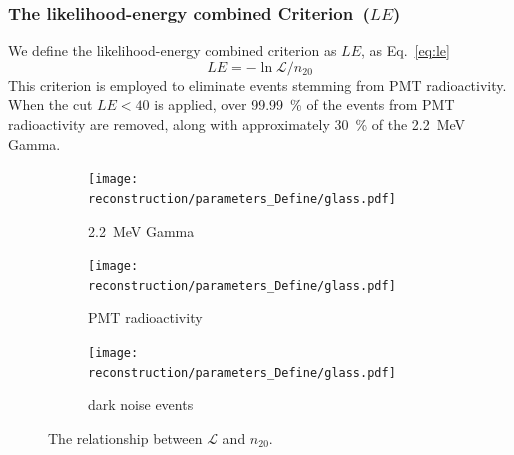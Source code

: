 \subsubsection{The likelihood-energy combined Criterion~($LE$)}
We define the likelihood-energy combined criterion as $LE$, as Eq.~\eqref{eq:le}
\begin{equation}
	LE = -\ln \mathcal{L}/n_{20}
	\label{eq:le}
\end{equation}
This criterion is employed to eliminate events stemming from PMT radioactivity. When the cut $LE < 40$ is applied, over \SI{99.99}{\%} of the events from PMT radioactivity are removed, along with approximately \SI{30}{\%} of the \SI{2.2}{MeV} Gamma.
\begin{figure}[htbp]
	\centering
	\begin{subfigure}{0.32\textwidth} %
		\centering
		\texttt{[image: reconstruction/parameters\_Define/glass.pdf]}
		\caption{\SI{2.2}{MeV} Gamma}
		\label{fig:glass3}
	\end{subfigure}%
	\hfill
	\begin{subfigure}{0.32\textwidth}
		\centering
		\texttt{[image: reconstruction/parameters\_Define/glass.pdf]}
		\caption{PMT radioactivity}
		\label{fig:glass6}
	\end{subfigure}%
	\hfill
	\begin{subfigure}{0.32\textwidth}
		\centering
		\texttt{[image: reconstruction/parameters\_Define/glass.pdf]}
		\caption{dark noise events}
		\label{fig:glass9}
	\end{subfigure}
	\caption{The relationship between $\mathcal{L}$ and $n_{20}$.}
	\label{fig:glass_all}
\end{figure}


